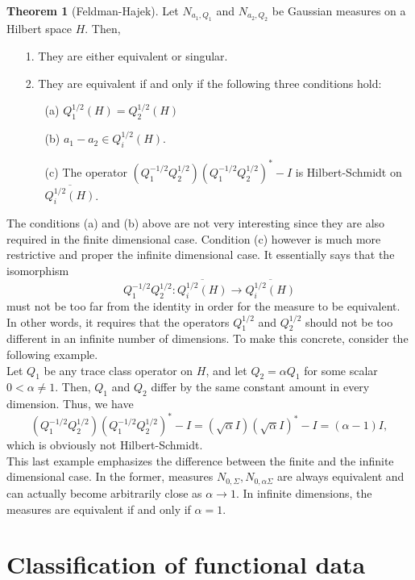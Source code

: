\documentclass[10pt, a4paper]{report}
\theoremstyle{definition}
\newtheorem{theorem}{Theorem}
\theoremstyle{remark}
\begin{document}
\begin{theorem}[Feldman-Hajek]
	Let $N_{a_1,Q_1}$ and $N_{a_2,Q_2}$ be Gaussian measures on a Hilbert space $H$. Then,
	\begin{itemize}
		\item[1.] They are either equivalent or singular.
		\item[2.] They are equivalent if and only if the following three conditions hold:
		\begin{itemize}
			\item[(a)] $Q_1^{1/2}(H) = Q_2^{1/2}(H)$
			\item[(b)] $a_1-a_2 \in Q_i^{1/2}(H)$.
			\item[(c)] The operator $(Q_1^{-1/2}Q_2^{1/2})(Q_1^{-1/2}Q_2^{1/2})^* - I$ is Hilbert-Schmidt on $\overline{Q_i^{1/2}(H)}$.
		\end{itemize}
	\end{itemize}
\end{theorem}
The conditions (a) and (b) above are not very interesting since they are also required in the finite dimensional case. Condition (c) however is much more restrictive and proper the infinite dimensional case. It essentially says that the isomorphism 
$$ Q_1^{-1/2}Q_2^{1/2}: \overline{Q_i^{1/2}(H)} \to \overline{Q_i^{1/2}(H)}$$
must not be too far from the identity in order for the measure to be equivalent. In other words, it requires that the operators $Q_1^{1/2}$ and $Q_2^{1/2}$ should not be too different in an infinite number of dimensions. To make this concrete, consider the following example.\\
Let $Q_1$ be any trace class operator on $H$, and let $Q_2=\alpha Q_1$ for some scalar $0<\alpha \ne 1$. Then, $Q_1$ and $Q_2$ differ by the same constant amount in every dimension. Thus, we have 
$$(Q_1^{-1/2}Q_2^{1/2})(Q_1^{-1/2}Q_2^{1/2})^* - I = (\sqrt{\alpha}I)(\sqrt{\alpha} I)^*-I = (\alpha-1)I,$$
which is obviously not Hilbert-Schmidt.\\
This last example emphasizes the difference between the finite and the infinite dimensional case. In the former, measures $N_{0, \Sigma}, N_{0,\alpha\Sigma}$ are always equivalent and can actually become arbitrarily close as $\alpha\to 1$. In infinite dimensions, the measures are equivalent if and only if $\alpha=1$.

\chapter{Classification of functional data}
\end{document}
